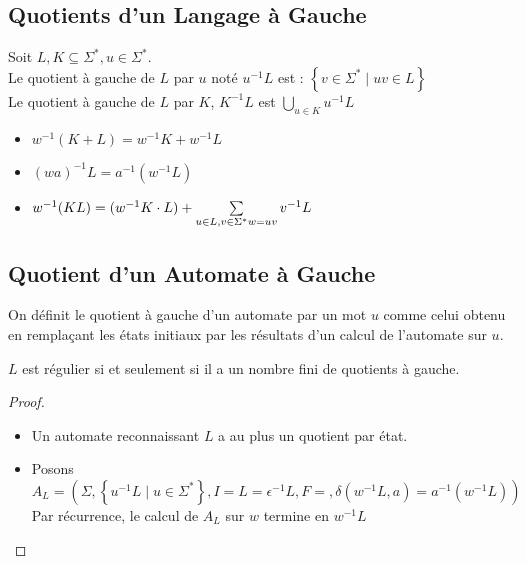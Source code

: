 \documentclass{cours}
\begin{document}
\subsection{Quotients d'un Langage à Gauche}
\begin{definition}
    Soit $L, K \subseteq \Sigma^{*}, u \in \Sigma^{*}$. \\
    Le quotient à gauche de $L$ par $u$ noté $u^{-1}L$ est : $\left\{v \in \Sigma^{*} \mid uv \in L\right\}$\\
    Le quotient à gauche de $L$ par $K$, $K^{-1}L$ est $\bigcup_{u \in K}u^{-1}L$
\end{definition}
\begin{proposition}
    \begin{itemize}
        \item $w^{-1}(K+L) = w^{-1}K + w^{-1}L$
        \item $(wa)^{-1}L = a^{-1}(w^{-1}L)$
        \item $w^{-1}(KL) = (w^{-1}K \cdot L) + \sum\limits_{u \in L, v \in \Sigma^{*}\\ w = uv} v^{-1}L$
    \end{itemize}
\end{proposition}

\subsection{Quotient d'un Automate à Gauche}
\begin{definition}
    On définit le quotient à gauche d'un automate par un mot $u$ comme celui obtenu en remplaçant les états initiaux par les résultats d'un calcul de l'automate sur $u$.
\end{definition}
\begin{proposition}
    $L$ est régulier si et seulement si il a un nombre fini de quotients à gauche.
\end{proposition}
\begin{proof}
    \begin{itemize}
        \item Un automate reconnaissant $L$ a au plus un quotient par état.
        \item Posons $A_{L} = \left(\Sigma, \left\{u^{-1}L \mid u \in \Sigma^{*} \right\}, I = L = \epsilon^{-1}L, F = , \delta(w^{-1}L, a) = a^{-1}(w^{-1}L)\right)$\\
        Par récurrence, le calcul de $A_{L}$ sur $w$ termine en $w^{-1}L$
    \end{itemize}
\end{proof}
\end{document}
